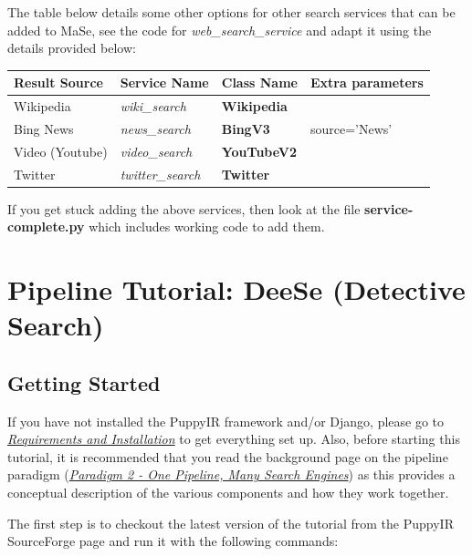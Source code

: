 \documentclass[letterpaper,10pt,english]{sphinxmanual}
\begin{document}
The table below details some other options for other search services that can be added to MaSe, see the code for \emph{web\_search\_service} and adapt it using the details provided below:

\begin{tabulary}{\linewidth}{|L|L|L|L|}
\hline
\textbf{
Result Source
} & \textbf{
Service Name
} & \textbf{
Class Name
} & \textbf{
Extra parameters
}\\\hline

Wikipedia
 & 
\emph{wiki\_search}
 & 
\textbf{Wikipedia}
 & \\\hline

Bing News
 & 
\emph{news\_search}
 & 
\textbf{BingV3}
 & 
source='News'
\\\hline

Video (Youtube)
 & 
\emph{video\_search}
 & 
\textbf{YouTubeV2}
 & \\\hline

Twitter
 & 
\emph{twitter\_search}
 & 
\textbf{Twitter}
 & \\\hline
\end{tabulary}


If you get stuck adding the above services, then look at the file \textbf{service-complete.py} which includes working code to add them.


\section{Pipeline Tutorial: DeeSe (Detective Search)}
\label{pipeline-tutorial:pipeline-puppyir-tutorial}\label{pipeline-tutorial:pipeline-tutorial-deese-detective-search}\label{pipeline-tutorial::doc}

\subsection{Getting Started}
\label{pipeline-tutorial:getting-started}
If you have not installed the PuppyIR framework and/or Django, please go to {\hyperref[installation:requirements-and-installation]{\emph{Requirements and Installation}}} to get everything set up. Also, before starting this tutorial, it is recommended that you read the background page on the pipeline paradigm ({\hyperref[pipeline:pipeline-architecture]{\emph{Paradigm 2 - One Pipeline, Many Search Engines}}}) as this provides a conceptual description of the various components and how they work together.

The first step is to checkout the latest version of the tutorial from the PuppyIR SourceForge page and run it with the following commands:
\end{document}
